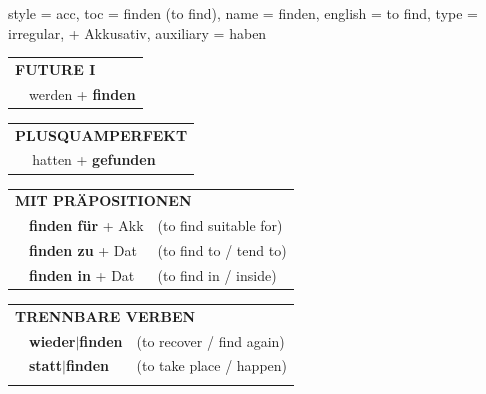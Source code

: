 \begin{verbentry}{
  style = {acc},
  toc = {finden (to find)},
  name = {finden},
  english = {to find},
  type = {irregular, + Akkusativ},
  auxiliary = {haben}
}
\begin{tabular}{rl}
    \multicolumn{2}{l}{\textbf{FUTURE I} }\\
  &  werden + \textbf{finden}\\
 
  \end{tabular}
\hfill
   \begin{tabular}{rl}
      \multicolumn{2}{l}{\textbf{PLUSQUAMPERFEKT}}\\
   & hatten + \textbf{gefunden}\\
  \end{tabular}
  
   \vspace{10pt}

\begin{tabular}{lll}
      \multicolumn{3}{l}{\textbf{MIT PRÄPOSITIONEN}}\\
& \textbf{finden für} + Akk & (to find suitable for)\\
& \textbf{finden zu} + Dat & (to find to / tend to)\\
& \textbf{finden in} + Dat & (to find in / inside)\\
\end{tabular}
  \hfill
\begin{tabular}{lll}
      \multicolumn{3}{l}{\textbf{TRENNBARE VERBEN}}\\
 & \textbf{wieder$|$finden} & (to recover / find again)\\
 & \textbf{statt$|$finden} & (to take place / happen)\\
\vspace{10pt}
  \end{tabular}

  \vspace{-5pt}
\end{verbentry}


